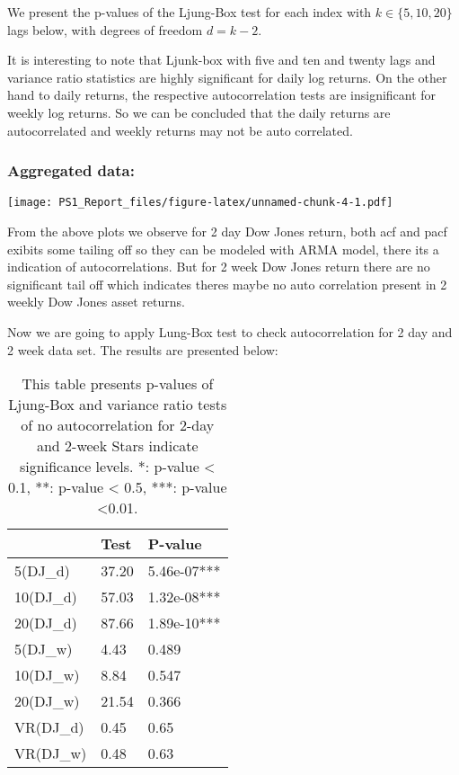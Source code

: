 \documentclass[
]{article}
\begin{document}
We present the p-values of the Ljung-Box test for each index with
\(k \in \{5, 10, 20\}\) lags below, with degrees of freedom
\(d = k - 2\).

It is interesting to note that Ljunk-box with five and ten and twenty
lags and variance ratio statistics are highly significant for daily log
returns. On the other hand to daily returns, the respective
autocorrelation tests are insignificant for weekly log returns. So we
can be concluded that the daily returns are autocorrelated and weekly
returns may not be auto correlated.

\hypertarget{aggregated-data}{%
\subsubsection{Aggregated data:}\label{aggregated-data}}

\texttt{[image: PS1\_Report\_files/figure-latex/unnamed-chunk-4-1.pdf]}

From the above plots we observe for 2 day Dow Jones return, both acf and
pacf exibits some tailing off so they can be modeled with ARMA model,
there its a indication of autocorrelations. But for 2 week Dow Jones
return there are no significant tail off which indicates theres maybe no
auto correlation present in 2 weekly Dow Jones asset returns.

Now we are going to apply Lung-Box test to check autocorrelation for 2
day and 2 week data set. The results are presented below:

\begin{table}

\caption{\label{tab:unnamed-chunk-5}This table presents p-values of Ljung-Box and variance ratio tests of no autocorrelation for 2-day and 2-week Stars indicate significance levels. *: p-value < 0.1, **: p-value < 0.5, ***: p-value <0.01.}
\centering
\begin{tabular}[t]{l|l|l}
\hline
  & Test & P-value\\
\hline
5(DJ\_d) & 37.20 & 5.46e-07***\\
\hline
10(DJ\_d) & 57.03 & 1.32e-08***\\
\hline
20(DJ\_d) & 87.66 & 1.89e-10***\\
\hline
5(DJ\_w) & 4.43 & 0.489\\
\hline
10(DJ\_w) & 8.84 & 0.547\\
\hline
20(DJ\_w) & 21.54 & 0.366\\
\hline
VR(DJ\_d) & 0.45 & 0.65\\
\hline
VR(DJ\_w) & 0.48 & 0.63\\
\hline
\end{tabular}
\end{table}
\end{document}
